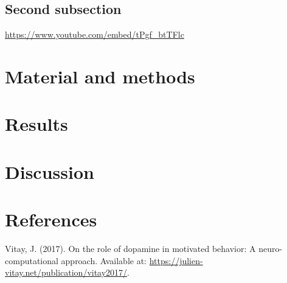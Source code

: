 \documentclass[
  a4paper,
]{article}
\newlength{\cslhangindent}
\newlength{\cslentryspacingunit} %
\newenvironment{CSLReferences}[2] %
 {%
  \setlength{\parindent}{0pt}
  \ifodd #1
  \let\oldpar\par
  \def\par{\hangindent=\cslhangindent\oldpar}
  \fi
  \setlength{\parskip}{#2\cslentryspacingunit}
 }%
 {}
\begin{document}
\hypertarget{second-subsection}{%
\subsection{Second subsection}\label{second-subsection}}

\url{https://www.youtube.com/embed/tPgf_btTFlc}

\hypertarget{material-and-methods}{%
\section{Material and methods}\label{material-and-methods}}

\hypertarget{sec-results}{%
\section{Results}\label{sec-results}}

\hypertarget{discussion}{%
\section{Discussion}\label{discussion}}

\hypertarget{references}{%
\section*{References}\label{references}}

\hypertarget{refs}{}
\begin{CSLReferences}{1}{0}
\leavevmode{}%
Vitay, J. (2017). On the role of dopamine in motivated behavior: A
neuro-computational approach. Available at:
\url{https://julien-vitay.net/publication/vitay2017/}.

\end{CSLReferences}
\end{document}
